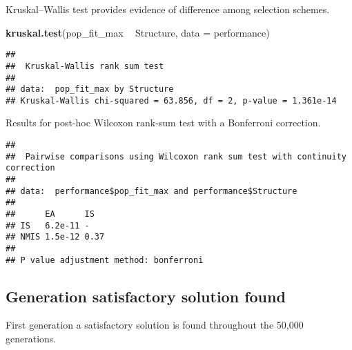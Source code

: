 \documentclass[]{book}
\newenvironment{Shaded}{\begin{snugshade}}{\end{snugshade}}
\newcommand{\DataTypeTok}[1]{\textcolor[rgb]{0.13,0.29,0.53}{#1}}
\newcommand{\KeywordTok}[1]{\textcolor[rgb]{0.13,0.29,0.53}{\textbf{#1}}}
\newcommand{\NormalTok}[1]{#1}
\newcommand{\OperatorTok}[1]{\textcolor[rgb]{0.81,0.36,0.00}{\textbf{#1}}}
\newcommand{\OtherTok}[1]{\textcolor[rgb]{0.56,0.35,0.01}{#1}}
\newcommand{\StringTok}[1]{\textcolor[rgb]{0.31,0.60,0.02}{#1}}
\begin{document}
Kruskal--Wallis test provides evidence of difference among selection schemes.

\begin{Shaded}
\begin{Highlighting}[]
\KeywordTok{kruskal.test}\NormalTok{(pop_fit_max }\OperatorTok{~}\StringTok{ }\NormalTok{Structure, }\DataTypeTok{data =}\NormalTok{ performance)}
\end{Highlighting}
\end{Shaded}

\begin{verbatim}
## 
##  Kruskal-Wallis rank sum test
## 
## data:  pop_fit_max by Structure
## Kruskal-Wallis chi-squared = 63.856, df = 2, p-value = 1.361e-14
\end{verbatim}

Results for post-hoc Wilcoxon rank-sum test with a Bonferroni correction.

\begin{Shaded}
\end{Shaded}

\begin{verbatim}
## 
##  Pairwise comparisons using Wilcoxon rank sum test with continuity correction 
## 
## data:  performance$pop_fit_max and performance$Structure 
## 
##      EA      IS  
## IS   6.2e-11 -   
## NMIS 1.5e-12 0.37
## 
## P value adjustment method: bonferroni
\end{verbatim}

\hypertarget{generation-satisfactory-solution-found-23}{%
\subsection{Generation satisfactory solution found}\label{generation-satisfactory-solution-found-23}}

First generation a satisfactory solution is found throughout the 50,000 generations.
\end{document}

